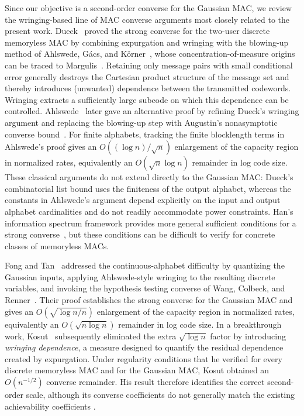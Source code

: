 \documentclass[11pt,onecolumn]{IEEEtran}
\begin{document}
Since our objective is a second-order converse for the Gaussian MAC, we  
review the wringing-based line of MAC  converse arguments most closely related
to the present work.  Dueck~\cite{Dueck1981StrongConverse} proved the strong
converse for the two-user discrete memoryless MAC by combining expurgation
and wringing with the blowing-up method of Ahlswede, G\'acs, and
K\"orner~\cite{AhlswedeGacsKorner1976}, whose concentration-of-measure
origins can be traced to Margulis~\cite{Margulis1974Probabilistic}.
Retaining only message pairs with small conditional error generally destroys
the Cartesian product structure of the message set and thereby introduces (unwanted)
dependence between the transmitted codewords. Wringing extracts a
sufficiently large subcode on which this dependence can be controlled.
Ahlswede~\cite{Ahlswede1982Elementary} later gave an alternative proof by
refining Dueck's wringing argument and replacing the blowing-up step with
Augustin's nonasymptotic converse bound~\cite{Augustin1966}. For  finite
alphabets, tracking the finite blocklength terms in Ahlswede's proof gives an
$O((\log n)/\sqrt n)$ enlargement of the capacity region in normalized
rates, equivalently an $O(\sqrt n\log n)$ remainder in log code size. These
classical arguments do not extend directly to the Gaussian MAC: Dueck's
combinatorial list bound uses the finiteness of the output alphabet, whereas
the constants in Ahlswede's argument depend explicitly on the input and
output alphabet cardinalities and do not readily accommodate power
constraints. Han's information spectrum framework provides more general
sufficient conditions for a strong converse~\cite{Han98}, but these
conditions can be difficult to verify for concrete classes of memoryless
MACs.

Fong and Tan~\cite{fongtan16} addressed the continuous-alphabet difficulty by
quantizing the Gaussian inputs, applying Ahlswede-style wringing to the
resulting discrete variables, and invoking the hypothesis testing
converse of Wang, Colbeck, and Renner~\cite{WangColbeckRenner2009}. Their proof establishes the strong converse for the
Gaussian MAC and gives an $O(\sqrt{\log n/n})$ enlargement of the capacity
region in normalized rates, equivalently an $O(\sqrt{n\log n})$ remainder in
log code size. In a breakthrough work, Kosut~\cite{Kosut2022Wringing} subsequently eliminated the
extra $\sqrt{\log n}$ factor by introducing \emph{wringing dependence}, a
measure designed to quantify the residual dependence created by expurgation.
Under regularity conditions that he verified for every discrete memoryless
MAC and for the Gaussian MAC, Kosut obtained an $O(n^{-1/2})$ converse
remainder. His result therefore identifies the correct second-order scale,
although its converse coefficients do not generally match the existing
achievability coefficients \cite{MolavianJaziLaneman2015,ScarlettMartinezGuillen2015,yavas21}.
\end{document}
